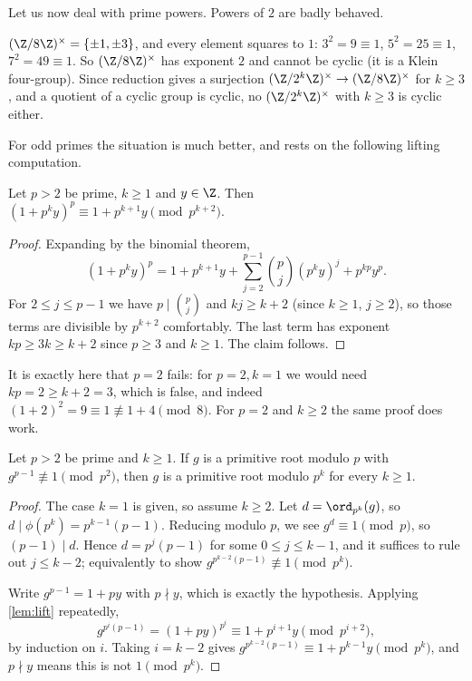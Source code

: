 Let us now deal with prime powers. Powers of $2$ are badly behaved.

\begin{example}
	$(\Z/8\Z)^\times = \{\pm 1, \pm 3\}$, and every element squares to $1$: $3^2 = 9 \equiv 1$, $5^2 = 25 \equiv 1$, $7^2 = 49 \equiv 1$. So $(\Z/8\Z)^\times$ has exponent $2$ and cannot be cyclic (it is a Klein four-group). Since reduction gives a surjection $(\Z/2^k\Z)^\times \to (\Z/8\Z)^\times$ for $k \geq 3$, and a quotient of a cyclic group is cyclic, no $(\Z/2^k\Z)^\times$ with $k \geq 3$ is cyclic either.
\end{example}

For odd primes the situation is much better, and rests on the following lifting computation.

\begin{lemma}\label{lem:lift}
	Let $p > 2$ be prime, $k \geq 1$ and $y \in \Z$. Then $(1 + p^k y)^p \equiv 1 + p^{k+1}y \pmod{p^{k+2}}$.
\end{lemma}
\begin{proof}
	Expanding by the binomial theorem,
	$$
	(1 + p^k y)^p = 1 + p^{k+1}y + \sum_{j = 2}^{p-1} \binom{p}{j}(p^k y)^j + p^{kp}y^p.
	$$
	For $2 \leq j \leq p - 1$ we have $p \mid \binom pj$ and $kj \geq k + 2$ (since $k \geq 1$, $j \geq 2$), so those terms are divisible by $p^{k+2}$ comfortably. The last term has exponent $kp \geq 3k \geq k + 2$ since $p \geq 3$ and $k \geq 1$. The claim follows.
\end{proof}

\begin{remark}
	It is exactly here that $p = 2$ fails: for $p = 2, k = 1$ we would need $kp = 2 \geq k + 2 = 3$, which is false, and indeed $(1 + 2)^2 = 9 \equiv 1 \not\equiv 1 + 4 \pmod 8$. For $p = 2$ and $k \geq 2$ the same proof does work.
\end{remark}

\begin{lemma}\label{lem:primroot2}
	Let $p > 2$ be prime and $k \geq 1$. If $g$ is a primitive root modulo $p$ with $g^{p-1} \not\equiv 1 \pmod{p^2}$, then $g$ is a primitive root modulo $p^k$ for every $k \geq 1$.
\end{lemma}
\begin{proof}
	The case $k = 1$ is given, so assume $k \geq 2$. Let $d = \ord_{p^k}(g)$, so $d \mid \phi(p^k) = p^{k-1}(p-1)$. Reducing modulo $p$, we see $g^d \equiv 1 \pmod p$, so $(p - 1) \mid d$. Hence $d = p^{j}(p-1)$ for some $0 \leq j \leq k - 1$, and it suffices to rule out $j \leq k - 2$; equivalently to show $g^{p^{k-2}(p-1)} \not\equiv 1 \pmod{p^k}$.

	Write $g^{p-1} = 1 + py$ with $p \nmid y$, which is exactly the hypothesis. Applying \autoref{lem:lift} repeatedly,
	$$
	g^{p^{i}(p-1)} = (1 + py)^{p^i} \equiv 1 + p^{i+1}y \pmod{p^{i + 2}},
	$$
	by induction on $i$. Taking $i = k - 2$ gives $g^{p^{k-2}(p-1)} \equiv 1 + p^{k-1}y \pmod{p^{k}}$, and $p \nmid y$ means this is not $1 \pmod{p^k}$.
\end{proof}

